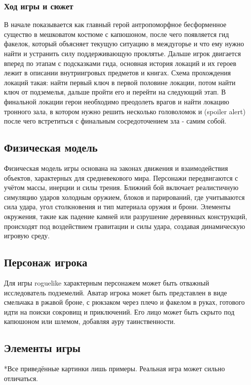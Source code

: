 \documentclass{article}
\begin{document}
\subsubsection{Ход игры и сюжет}
В начале показывается как главный герой антропоморфное бесформенное существо в мешковатом костюме с капюшоном, после чего появляется гид факелок, который объясняет текущую ситуацию в междугорье и что ему нужно найти и устранить силу поддерживающую проклятье. Дальше игрок двигается вперед по этапам с подсказками гида, основная история локаций и их героев лежит в описании внутриигровых предметов и книгах. Схема прохождения локаций такая: найти первый ключ в первой половине локации, потом найти ключ от подземелья, дальше пройти его и перейти на следующий этап. В финальной локации герои необходимо преодолеть врагов и найти локацию тронного зала, в котором нужно решить  несколько головоломок и (spoiler alert) после чего встретиться с финальным сосредоточением зла - самим собой.
\subsection{Физическая модель}
Физическая модель игры основана на законах движения и взаимодействия объектов, характерных для средневекового мира. Персонажи передвигаются с учётом массы, инерции и силы трения. Ближний бой включает реалистичную симуляцию ударов холодным оружием, блоков и парирований, где учитываются сила удара, угол столкновения и тип материала оружия и брони. Элементы окружения, такие как падение камней или разрушение деревянных конструкций, происходят под воздействием гравитации и силы удара, создавая динамическую игровую среду.
\subsection{Персонаж игрока}
Для игры roguelike характерным персонажем может быть отважный исследователь подземелий. Аватар игрока может быть представлен в виде смельчака в ржавой броне, с рюкзаком через плечо и факелом в руках, готового идти на поиски сокровищ и приключений. Его лицо может быть скрыто под капюшоном или шлемом, добавляя ауру таинственности.
\subsection{Элементы игры}
*Все приведённые картинки лишь примеры. Реальная игра может сильно отличаться.
\end{document}
